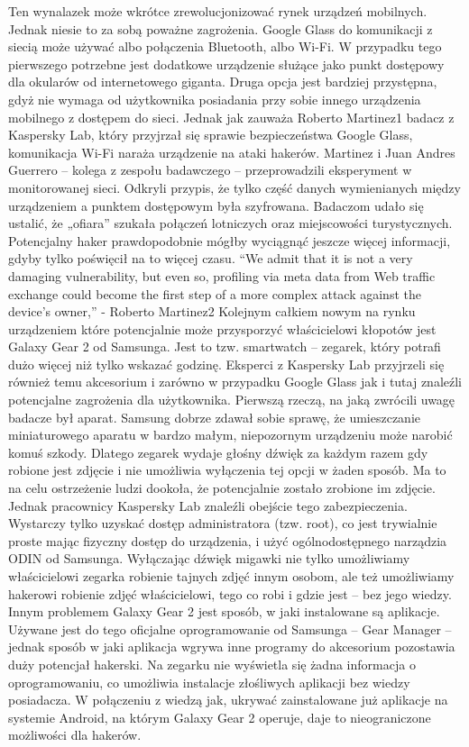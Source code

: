 \documentclass[brudnopis]{xmgr}
\begin{document}
Ten wynalazek może wkrótce zrewolucjonizować rynek urządzeń mobilnych. Jednak niesie to za sobą poważne zagrożenia. Google Glass do komunikacji z siecią może używać albo połączenia Bluetooth, albo Wi-Fi. W przypadku tego pierwszego potrzebne jest dodatkowe urządzenie służące jako punkt dostępowy dla okularów od internetowego giganta. Druga opcja jest bardziej przystępna, gdyż nie wymaga od użytkownika posiadania przy sobie innego urządzenia mobilnego z dostępem do sieci. Jednak jak zauważa Roberto Martinez1 badacz z Kaspersky Lab, który przyjrzał się sprawie bezpieczeństwa Google Glass, komunikacja Wi-Fi naraża urządzenie na ataki hakerów. Martinez i Juan Andres Guerrero – kolega z zespołu badawczego – przeprowadzili eksperyment w monitorowanej sieci. Odkryli przypis, że tylko część danych wymienianych między urządzeniem a punktem dostępowym była szyfrowana. Badaczom udało się ustalić, że „ofiara” szukała połączeń lotniczych oraz miejscowości turystycznych. Potencjalny haker prawdopodobnie mógłby wyciągnąć jeszcze więcej informacji, gdyby tylko poświęcił na to więcej czasu.
“We admit that it is not a very damaging vulnerability, but even so, profiling via meta data from Web traffic exchange could become the first step of a more complex attack against the device’s owner,” - Roberto Martinez2
Kolejnym całkiem nowym na rynku urządzeniem które potencjalnie może przysporzyć właścicielowi kłopotów jest Galaxy Gear 2 od Samsunga. Jest to tzw. smartwatch – zegarek, który potrafi dużo więcej niż tylko wskazać godzinę. Eksperci z Kaspersky Lab przyjrzeli się również temu akcesorium i zarówno w przypadku Google Glass jak i tutaj znaleźli potencjalne zagrożenia dla użytkownika. Pierwszą rzeczą, na jaką zwrócili uwagę badacze był aparat. Samsung dobrze zdawał sobie sprawę, że umieszczanie miniaturowego aparatu w bardzo małym, niepozornym urządzeniu może narobić komuś szkody. Dlatego zegarek wydaje głośny dźwięk za każdym razem gdy robione jest zdjęcie i nie umożliwia wyłączenia tej opcji w żaden sposób. Ma to na celu ostrzeżenie ludzi dookoła, że potencjalnie zostało zrobione im zdjęcie. Jednak pracownicy Kaspersky Lab znaleźli obejście tego zabezpieczenia. Wystarczy tylko uzyskać dostęp administratora (tzw. root), co jest trywialnie proste mając fizyczny dostęp do urządzenia, i użyć ogólnodostępnego narządzia ODIN od Samsunga. Wyłączając dźwięk migawki nie tylko umożliwiamy właścicielowi zegarka robienie tajnych zdjęć innym osobom, ale też umożliwiamy hakerowi robienie zdjęć właścicielowi, tego co robi i gdzie jest – bez jego wiedzy.
Innym problemem Galaxy Gear 2 jest sposób, w jaki instalowane są aplikacje. Używane jest do tego oficjalne oprogramowanie od Samsunga – Gear Manager – jednak sposób w jaki aplikacja wgrywa inne programy do akcesorium pozostawia duży potencjał hakerski. Na zegarku nie wyświetla się żadna informacja o oprogramowaniu, co umożliwia instalacje złośliwych aplikacji bez wiedzy posiadacza. W połączeniu z wiedzą jak, ukrywać zainstalowane już aplikacje na systemie Android, na którym Galaxy Gear 2 operuje, daje to nieograniczone możliwości dla hakerów.
\end{document}
